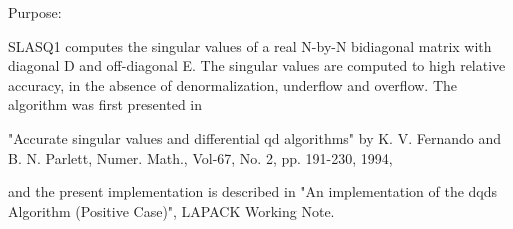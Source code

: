  \begin{DoxyParagraph}{Purpose\+: }
\begin{DoxyVerb} SLASQ1 computes the singular values of a real N-by-N bidiagonal
 matrix with diagonal D and off-diagonal E. The singular values
 are computed to high relative accuracy, in the absence of
 denormalization, underflow and overflow. The algorithm was first
 presented in

 "Accurate singular values and differential qd algorithms" by K. V.
 Fernando and B. N. Parlett, Numer. Math., Vol-67, No. 2, pp. 191-230,
 1994,

 and the present implementation is described in "An implementation of
 the dqds Algorithm (Positive Case)", LAPACK Working Note.\end{DoxyVerb}
 
\end{DoxyParagraph}

